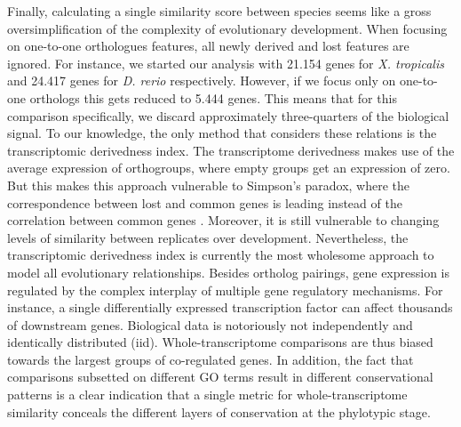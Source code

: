 Finally, calculating a single similarity score between species seems like a gross oversimplification of the complexity of evolutionary development. When focusing on one-to-one orthologues features, all newly derived and lost features are ignored. For instance, we started our analysis with 21.154 genes for \textit{X. tropicalis} and 24.417 genes for \textit{D. rerio} respectively. However, if we focus only on one-to-one orthologs this gets reduced to 5.444 genes. This means that for this comparison specifically, we discard approximately three-quarters of the biological signal. To our knowledge, the only method that considers these relations is the transcriptomic derivedness index\cite{Leong2021}. The transcriptome derivedness makes use of the average expression of orthogroups, where empty groups get an expression of zero. But this makes this approach vulnerable to Simpson's paradox, where the correspondence between lost and common genes is leading instead of the correlation between common genes \cite{Saccenti2023}. Moreover, it is still vulnerable to changing levels of similarity between replicates over development. Nevertheless, the transcriptomic derivedness index is currently the most wholesome approach to model all evolutionary relationships. Besides ortholog pairings, gene expression is regulated by the complex interplay of multiple gene regulatory mechanisms. For instance, a single differentially expressed transcription factor can affect thousands of downstream genes. Biological data is notoriously not independently and identically distributed (iid). Whole-transcriptome comparisons are thus biased towards the largest groups of co-regulated genes. In addition, the fact that comparisons subsetted on different GO terms result in different conservational patterns is a clear indication that a single metric for whole-transcriptome similarity conceals the different layers of conservation at the phylotypic stage\cite{Malik2017,Gildor2019,Onimaru2021}.

